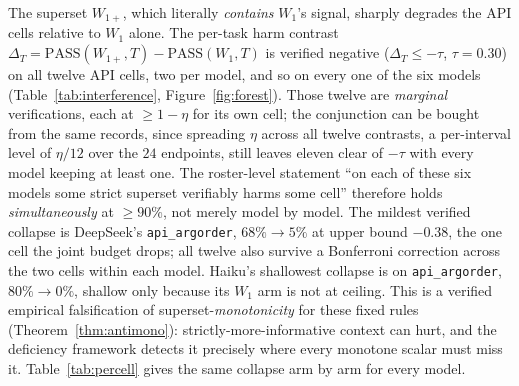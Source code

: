 \documentclass[11pt]{article}
\theoremstyle{plain}
\theoremstyle{definition}
\theoremstyle{remark}
\newcommand{\PASS}{\mathrm{PASS}}
\begin{document}
The superset $W_{1+}$, which literally \emph{contains} $W_1$'s signal, sharply degrades the API
cells relative to $W_1$ alone. The per-task harm contrast
$\Delta_T = \PASS(W_{1+},T) - \PASS(W_1,T)$ is verified negative ($\Delta_T \le -\tau$,
$\tau=0.30$) on all twelve API cells, two per model, and so on every one of the
six models (Table~\ref{tab:interference}, Figure~\ref{fig:forest}). Those twelve are \emph{marginal}
verifications, each at $\ge 1-\eta$ for its own cell; the conjunction can be bought from the same
records, since spreading $\eta$ across all twelve contrasts, a per-interval level of $\eta/12$ over
the $24$ endpoints, still leaves eleven clear of $-\tau$ with every model keeping at least one. The
roster-level statement ``on each of these six models some strict superset verifiably harms some
cell'' therefore holds \emph{simultaneously} at $\ge 90\%$, not merely model by model. The mildest
verified collapse is DeepSeek's \texttt{api\_argorder}, $68\% \to 5\%$ at upper bound $-0.38$, the
one cell the joint budget drops; all twelve also survive a Bonferroni correction across the two
cells within each model. Haiku's shallowest collapse is on \texttt{api\_argorder}, $80\%\to0\%$,
shallow only because its $W_1$ arm is not at ceiling. This is a verified empirical
falsification of superset-\emph{monotonicity} for these fixed rules (Theorem~\ref{thm:antimono}):
strictly-more-informative context can hurt, and the deficiency framework detects it precisely where
every monotone scalar must miss it. Table~\ref{tab:percell} gives the same collapse arm by arm for
every model.
\end{document}
